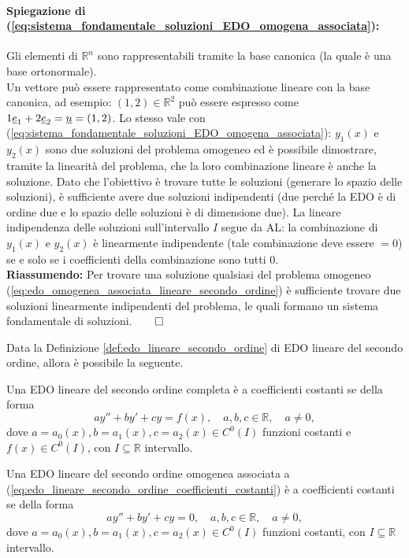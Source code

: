 \paragraph{Spiegazione di (\ref{eq:sistema_fondamentale_soluzioni_EDO_omogena_associata}):} Gli elementi di $\mathbb R^n$ sono rappresentabili tramite la base canonica (la quale è una \gls{base ortonormale}).\\
Un vettore può essere rappresentato come combinazione lineare con la base canonica, ad esempio: $(1,2)\in\mathbb R^2$ può essere espresso come $1\uline e_1 + 2\uline e_2=\uline u=(1,2)$. Lo stesso vale con (\ref{eq:sistema_fondamentale_soluzioni_EDO_omogena_associata}): $y_1(x)$ e $y_2(x)$ sono due soluzioni del problema omogeneo ed è possibile dimostrare, tramite la linearità del problema, che la loro combinazione lineare è anche la soluzione. Dato che l'obiettivo è trovare tutte le soluzioni (generare lo spazio delle soluzioni), è sufficiente avere due soluzioni indipendenti (due perché la EDO è di ordine due e lo spazio delle soluzioni è di dimensione due). La lineare indipendenza delle soluzioni sull'intervallo $I$ segue da AL:  la combinazione di $y_1(x)$ e $y_2(x)$ è linearmente indipendente (tale combinazione deve essere $=0$) se e solo se i coefficienti della combinazione sono tutti 0.\\
\textbf{Riassumendo:} Per trovare una soluzione qualsiasi del problema omogeneo (\ref{eq:edo_omogenea_associata_lineare_secondo_ordine}) è sufficiente trovare due soluzioni linearmente indipendenti del problema, le quali formano un sistema fondamentale di soluzioni.$\qed$

Data la Definizione \ref{def:edo_lineare_secondo_ordine} di EDO lineare del secondo ordine, allora è possibile la seguente.
\begin{definition}
	Una EDO lineare del secondo ordine completa è a coefficienti costanti se della forma
	\begin{equation}\label{eq:edo_lineare_secondo_ordine_coefficienti_costanti}
		a y'' + by' + cy =  f(x),\quad a,b,c\in\mathbb{R},\quad a\neq 0,
	\end{equation}
	dove $a=a_0(x), b=a_1(x), c=a_2(x)\in C^0(I)$ funzioni costanti e $f(x)\in C^0(I)$, con $I\subseteq\mathbb{R}$ intervallo.
\end{definition}

\begin{definition}
	Una EDO lineare del secondo ordine omogenea associata a (\ref{eq:edo_lineare_secondo_ordine_coefficienti_costanti}) è a coefficienti costanti se della forma
	\begin{equation}\label{eq:edo_lineare_secondo_ordine_omogenea_coefficienti_costanti}
		a y'' + by' + cy =  0,\quad a,b,c\in\mathbb{R},\quad a\neq 0,
	\end{equation}
	dove $a=a_0(x), b=a_1(x), c=a_2(x)\in C^0(I)$ funzioni costanti, con $I\subseteq\mathbb{R}$ intervallo.
\end{definition}

